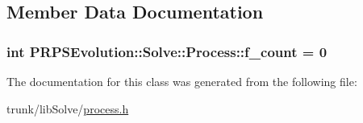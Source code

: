 \subsection{\-Member \-Data \-Documentation}
\hypertarget{class_p_r_p_s_evolution_1_1_solve_1_1_process_a8827a5fb7aa8209c5c8b6d16bbffb26d}{
\subsubsection[{f\-\_\-count}]{\setlength{\rightskip}{0pt plus 5cm}int {\bf \-P\-R\-P\-S\-Evolution\-::\-Solve\-::\-Process\-::f\-\_\-count} = 0}}\label{class_p_r_p_s_evolution_1_1_solve_1_1_process_a8827a5fb7aa8209c5c8b6d16bbffb26d}


\-The documentation for this class was generated from the following file\-:\begin{DoxyCompactItemize}
\item 
trunk/lib\-Solve/\hyperlink{process_8h}{process.\-h}\end{DoxyCompactItemize}
